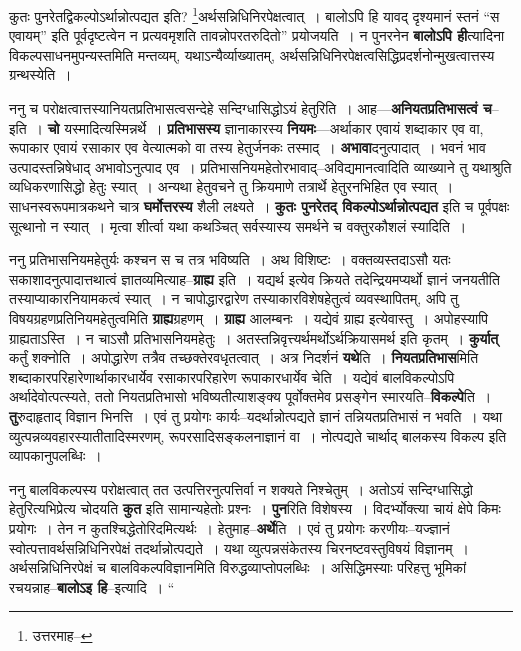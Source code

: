 \documentclass[article,12pt,a4paper]{memoir}
\begin{document}
	कुतः पुनरेतद्विकल्पोऽर्थान्नोत्पद्यत इति? \footnote{उत्तरमाह--\cite{dp-msD-n}}अर्थसन्निधिनिरपेक्षत्वात् । बालोऽपि हि यावद् दृश्यमानं स्तनं “स एवायम्” इति पूर्वदृष्टत्वेन न प्रत्यवमृशति तावन्नोपरतरुदितो” प्रयोजयति । न पुनरनेन \textbf{बालोऽपि ही}त्यादिना विकल्पसाधनमुपन्यस्तमिति मन्तव्यम्, यथाऽन्यैर्व्याख्यातम्, अर्थसन्निधिनिरपेक्षत्वसिद्धिप्रदर्शनोन्मुखत्वात्तस्य ग्रन्थस्येति ।
	\pend
      

	  \pstart ननु च परोक्षत्वात्तस्यानियतप्रतिभासत्वसन्देहे सन्दिग्धासिद्धोऽयं हेतुरिति । आह—\textbf{अनियतप्रतिभासत्वं च}--इति । \textbf{चो} यस्मादित्यस्मिन्नर्थे । \textbf{प्रतिभासस्य} ज्ञानाकारस्य \textbf{नियमः}—अर्थाकार एवायं शब्दाकार एव वा, रूपाकार एवायं रसाकार एव वेत्यात्मको वा तस्य हेतुर्जनकः तस्माद् । \textbf{अभावा}दनुत्पादात् । भवनं भाव उत्पादस्तन्निषेधाद् अभावोऽनुत्पाद एव । प्रतिभासनियमहेतोरभावाद्--अविद्यमानत्वादिति व्याख्याने तु यथाश्रुति व्यधिकरणासिद्धो हेतुः स्यात् । अन्यथा हेतुवचने तु क्रियमाणे तत्रार्थे हेतुरनभिहित एव स्यात् । साधनस्वरूपमात्रकथने चात्र \textbf{घर्मोत्तरस्य} शैली लक्ष्यते । \textbf{कुतः पुनरेतद् विकल्पोऽर्थान्नोत्पद्यत} इति च पूर्वपक्षः सूत्थानो न स्यात् । मृत्वा शीर्त्वा यथा कथञ्चित् सर्वस्यास्य समर्थने च वक्तुरकौशलं स्यादिति ।
	\pend
      

	  \pstart ननु प्रतिभासनियमहेतुर्यः कश्चन स च तत्र भविष्यति । अथ विशिष्टः । वक्तव्यस्तदाऽसौ यतः सकाशादनुत्पादात्तथात्वं ज्ञातव्यमित्याह--\textbf{ग्राह्य} इति । यद्यर्थ इत्येव क्रियते तदेन्द्रियमप्यर्थो ज्ञानं जनयतीति तस्याप्याकारनियामकत्वं स्यात् । न चापोद्धारद्वारेण तस्याकारविशेषहेतुत्वं व्यवस्थापितम्, अपि तु विषयग्रहणप्रतिनियमहेतुत्वमिति \textbf{ग्राह्य}ग्रहणम् । \textbf{ग्राह्य} आलम्बनः । यद्येवं ग्राह्य इत्येवास्तु । अपोहस्यापि ग्राह्यताऽस्ति । न चाऽसौ प्रतिभासनियमहेतुः । अतस्तन्निवृत्त्यर्थमर्थोऽर्थक्रियासमर्थ इति कृतम् । \textbf{कुर्यात्} कर्तुं शक्नोति । अपोद्धारेण तत्रैव तच्छक्तेरवधृतत्वात् । अत्र निदर्शनं \textbf{यथे}ति । \textbf{नियतप्रतिभास}मिति शब्दाकारपरिहारेणार्थाकारधार्येव रसाकारपरिहारेण रूपाकारधार्येव चेति । यद्येवं बालविकल्पोऽपि अर्थादेवोत्पत्स्यते, ततो नियतप्रतिभासो भविष्यतीत्याशङ्क्य पूर्वोक्तमेव प्रसङ्गेन स्मारयति--\textbf{विकल्पे}ति । \textbf{तु}रुदाहृताद् विज्ञान भिनत्ति । एवं तु प्रयोगः कार्यः--यदर्थान्नोत्पद्यते ज्ञानं तन्नियतप्रतिभासं न भवति । यथा व्युत्पन्नव्यवहारस्यातीतादिस्मरणम्, रूपरसादिसङ्कलनाज्ञानं वा । नोत्पद्यते चा\leavevmode{}र्थाद् बालकस्य विकल्प इति व्यापकानुपलब्धिः ।
	\pend
      

	  \pstart ननु बालविकल्पस्य परोक्षत्वात् तत उत्पत्तिरनुत्पत्तिर्वा न शक्यते निश्चेतुम् । अतोऽयं सन्दिग्धासिद्धो हेतुरित्यभिप्रेत्य चोदयति \textbf{कुत} इति सामान्यहेतोः प्रश्नः । \textbf{पुन}रिति विशेषस्य । विदर्भ्योक्त्या चायं क्षेपे किमः प्रयोगः । तेन न कुतश्चिद्धेतोरिदमित्यर्थः । हेतुमाह--\textbf{अर्थे}ति । एवं तु प्रयोगः करणीयः--यज्ज्ञानं स्वोत्पत्तावर्थसन्निधिनिरपेक्षं तदर्थान्नोत्पद्यते । यथा व्युत्पन्नसंकेतस्य चिरनष्टवस्तुविषयं विज्ञानम् । अर्थसन्निधिनिरपेक्षं च बालविकल्पविज्ञानमिति विरुद्धव्याप्तोपलब्धिः । असिद्धिमस्याः परिहत्तु भूमिकां रचयन्नाह--\textbf{बालोऽइ हि}--इत्यादि । \leavevmode{} “
	  
\end{document}

